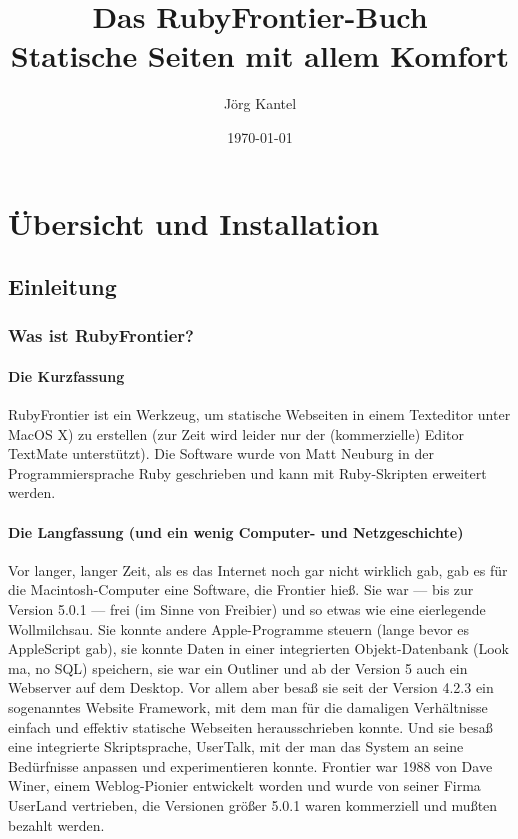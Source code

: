 \documentclass[11pt]{report}
\title{Das RubyFrontier-Buch\\Statische Seiten mit allem Komfort}
\author{Jörg Kantel}
\date{\today}
\begin{document}
\maketitle

\setcounter{tocdepth}{4}
\tableofcontents
\vspace*{1cm}

\part{Übersicht und Installation}
\label{sec-1}
\chapter{Einleitung}
\label{sec-1-1}
\section{Was ist RubyFrontier?}
\label{sec-1-1-1}

    
\subsection{Die Kurzfassung}
\label{sec-1-1-1-1}


RubyFrontier ist ein Werkzeug, um statische Webseiten in einem
Texteditor unter MacOS X) zu erstellen (zur Zeit wird leider nur der
(kommerzielle) Editor TextMate unterstützt). Die Software wurde von
Matt Neuburg in der Programmiersprache Ruby geschrieben und kann mit
Ruby-Skripten erweitert werden.
\subsection{Die Langfassung (und ein wenig Computer- und Netzgeschichte)}
\label{sec-1-1-1-2}


Vor langer, langer Zeit, als es das Internet noch gar nicht wirklich
gab, gab es für die Macintosh-Computer eine Software, die Frontier
hieß. Sie war — bis zur Version 5.0.1 — frei (im Sinne von Freibier)
und so etwas wie eine eierlegende Wollmilchsau. Sie konnte andere
Apple-Programme steuern (lange bevor es AppleScript gab), sie konnte
Daten in einer integrierten Objekt-Datenbank (Look ma, no SQL)
speichern, sie war ein Outliner und ab der Version 5 auch ein
Webserver auf dem Desktop. Vor allem aber besaß sie seit der Version
4.2.3 ein sogenanntes Website Framework, mit dem man für die damaligen
Verhältnisse einfach und effektiv statische Webseiten herausschrieben
konnte. Und sie besaß eine integrierte Skriptsprache, UserTalk, mit
der man das System an seine Bedürfnisse anpassen und experimentieren
konnte. Frontier war 1988 von Dave Winer, einem Weblog-Pionier
entwickelt worden und wurde von seiner Firma UserLand vertrieben, die
Versionen größer 5.0.1 waren kommerziell und mußten bezahlt werden.
\end{document}
